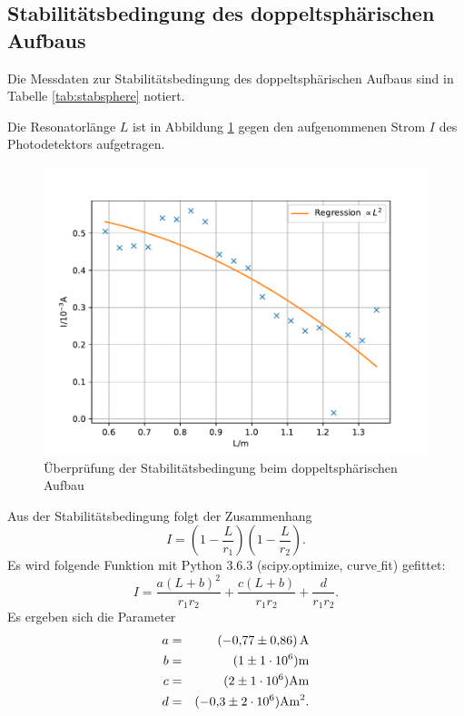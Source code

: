 \subsection{Stabilitätsbedingung des doppeltsphärischen Aufbaus}
Die Messdaten zur Stabilitätsbedingung des doppeltsphärischen Aufbaus sind in Tabelle \ref{tab:stabsphere} notiert.

Die Resonatorlänge $L$ ist in Abbildung \ref{fig:stabsphere} gegen den aufgenommenen Strom $I$ des Photodetektors aufgetragen.
\begin{figure}
  \centering
  \includegraphics[width=\textwidth]{stabsphere.pdf}
  \caption{Überprüfung der Stabilitätsbedingung beim doppeltsphärischen Aufbau}
  \label{fig:stabsphere}
\end{figure}
Aus der Stabilitätsbedingung folgt der Zusammenhang
\begin{equation*}
  I=\left(1-\frac{L}{r_1} \right) \left(1- \frac{L}{r_2} \right).
\end{equation*}
Es wird folgende Funktion mit Python 3.6.3 (scipy.optimize, curve$\_$fit) gefittet:
\begin{equation*}
  I= \frac{a(L+b)^2}{r_1 r_2}+\frac{c(L+b)}{r_1 r_2}+\frac{d}{r_1 r_2}.
\end{equation*}
Es ergeben sich die Parameter
\begin{align*}
a &=& \SI{ -0.77   \pm 0.86 }{A} \\
b &=&(\SI{  1  }{} \pm \SI{1e+06 }{}) \si{m} \\
c &=&(\SI{  2  }{} \pm \SI{1e+06 }{}) \si{Am} \\
d &=&(\SI{ -0.3}{} \pm \SI{2e+06 }{}) \si{Am^2}. \\
\end{align*}
%
%
\FloatBarrier

